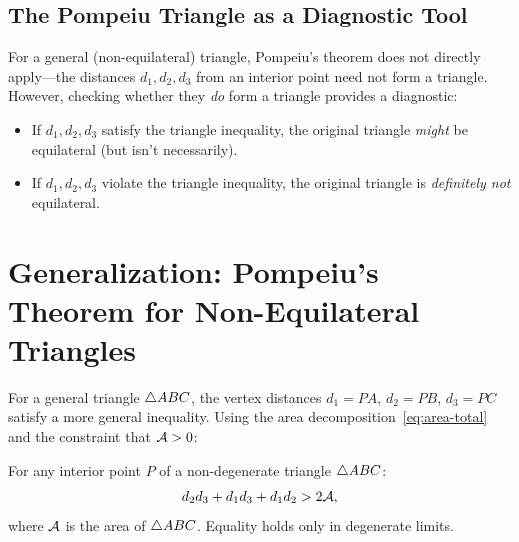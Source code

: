 \subsection{The Pompeiu Triangle as a Diagnostic Tool}

For a general (non-equilateral) triangle, Pompeiu's theorem does not directly apply---the distances $d_1, d_2, d_3$ from an interior point need not form a triangle. However, checking whether they \emph{do} form a triangle provides a diagnostic:

\begin{itemize}
    \item If $d_1, d_2, d_3$ satisfy the triangle inequality, the original triangle \emph{might} be equilateral (but isn't necessarily).
    \item If $d_1, d_2, d_3$ violate the triangle inequality, the original triangle is \emph{definitely not} equilateral.
\end{itemize}

\section{Generalization: Pompeiu's Theorem for Non-Equilateral Triangles}

For a general triangle $\triangle ABC$, the vertex distances $d_1 = PA$, $d_2 = PB$, $d_3 = PC$ satisfy a more general inequality. Using the area decomposition~\eqref{eq:area-total} and the constraint that $\mathcal{A} > 0$:

\begin{proposition}
For any interior point $P$ of a non-degenerate triangle $\triangle ABC$:
\begin{equation}
d_2 d_3 + d_1 d_3 + d_1 d_2 > 2\mathcal{A},
\end{equation}
where $\mathcal{A}$ is the area of $\triangle ABC$. Equality holds only in degenerate limits.
\end{proposition}
